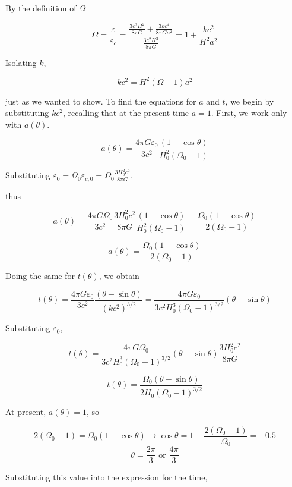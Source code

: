 \documentclass[11pt]{article}
\begin{document}
\begin{pproblem}
\begin{pssolution*}{}{}
    \begin{alternativas}
        \item By the definition of $\Omega$

        \[\Omega = \frac{\varepsilon}{\varepsilon_c} = \frac{\frac{3c^2 H^2}{8\pi G} + \frac{3kc^4}{8\pi Ga^2}}{\frac{3c^2H^2}{8\pi G}} = 1 + \frac{kc^2}{H^2a^2}\]

        Isolating \(k\),

        \[\boxed{kc^2 = H^2(\Omega -1)a^2}\]

        just as we wanted to show. To find the equations for \(a\) and \(t\), we begin by substituting \(kc^2\), recalling that at the present time \(a=1\). First, we work only with \(a(\theta)\).

        \[a(\theta) = \frac{4\pi G \varepsilon_0}{3c^2}\frac{(1-\cos\theta)}{H_0^2(\Omega_0-1)}\]

        Substituting \(\varepsilon_0 = \Omega_0 \varepsilon_{c,0} = \Omega_0\frac{3H_0^2c^2}{8\pi G}\),

        thus

        \[a(\theta) = \frac{4\pi G \Omega_0}{3c^2}\frac{3H_0^2c^2}{8\pi G}\frac{(1-\cos\theta)}{H_0^2(\Omega_0-1)} = \frac{\Omega_0(1-\cos\theta)}{2(\Omega_0-1)}\]

        \[\boxed{a(\theta) = \frac{\Omega_0(1-\cos\theta)}{2(\Omega_0-1)}}\]
        
        Doing the same for \(t(\theta)\), we obtain

        \[t(\theta) = \frac{4\pi G\varepsilon_0 }{3c^2}\frac{(\theta-\sin\theta)}{(kc^2)^{3/2}} = \frac{4\pi G \varepsilon_0}{3c^2H_0^3(\Omega_0-1)^{3/2}}(\theta-\sin\theta)\]

        Substituting \(\varepsilon_0\),

        \[t(\theta) = \frac{4\pi  G\Omega_0}{3c^2H_0^3(\Omega_0-1)^{3/2}}(\theta-\sin\theta)\frac{3H_0^2c^2}{8\pi G}\]

        \[\boxed{t(\theta) = \frac{\Omega_0(\theta-\sin\theta)}{2H_0(\Omega_0-1)^{3/2}}}\]

        
        \item At present, \(a(\theta)=1\), so
        
        \[2(\Omega_0-1) = \Omega_0(1-\cos\theta) \rightarrow \cos\theta = 1 -\frac{2(\Omega_0-1)}{\Omega_0} = -0.5\]
        \[\theta = \frac{2\pi}{3} \text{ or }\frac{4\pi}{3}\]

        Substituting this value into the expression for the time,


\end{alternativas}
\end{pssolution*}
\end{pproblem}
\end{document}
